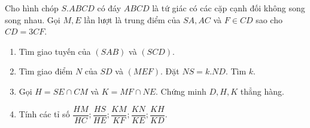 \begin{bt}%
	Cho hình chóp $S.ABCD$ có đáy $ABCD$ là tứ giác có các cặp cạnh đối không song song nhau. Gọi $M, E$ lần lượt là trung điểm của $SA, AC$ và $F \in CD$ sao cho $CD=3CF$.
	\begin{enumerate}
		\item Tìm giao tuyến của $(SAB)$ và $(SCD)$.
		\item Tìm giao điểm $N$ của $SD$ và $(MEF)$. Đặt $NS=k.ND$. Tìm $k$.
		\item Gọi $H=SE \cap CM$ và $K=MF \cap NE$. Chứng minh $D, H, K$ thẳng hàng.
		\item Tính các tỉ số $\dfrac{HM}{HC}; \dfrac{HS}{HE}; \dfrac{KM}{KF}; \dfrac{KN}{KE}; \dfrac{KH}{KD}$.
	\end{enumerate}
\end{bt}
